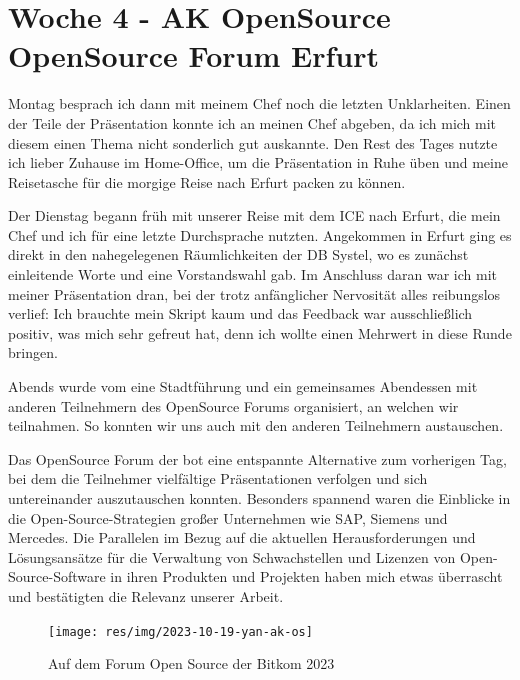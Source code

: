 \section{Woche 4 - AK OpenSource \headerand OpenSource Forum Erfurt} \label{sec:bericht-wo-4}


\lweekdaymarginpar{\weekdayMondayLong}

Montag besprach ich dann mit meinem Chef noch die letzten Unklarheiten.
Einen der Teile der Präsentation konnte ich an meinen Chef abgeben, da ich mich mit diesem einen Thema nicht sonderlich gut auskannte.
Den Rest des Tages nutzte ich lieber Zuhause im Home-Office, um die Präsentation in Ruhe üben und meine Reisetasche für die morgige Reise nach Erfurt packen zu können.

\sweekdaymarginpar{\weekdayTuesdayLong}

Der Dienstag begann früh mit unserer Reise mit dem ICE nach Erfurt, die mein Chef und ich für eine letzte Durchsprache nutzten.
Angekommen in Erfurt ging es direkt in den nahegelegenen Räumlichkeiten der DB Systel, wo es zunächst einleitende Worte und eine Vorstandswahl gab.
Im Anschluss daran war ich mit meiner Präsentation dran, bei der trotz anfänglicher Nervosität alles reibungslos verlief:
Ich brauchte mein Skript kaum und das Feedback war ausschließlich positiv, was mich sehr gefreut hat, denn ich wollte einen Mehrwert in diese Runde bringen.

Abends wurde vom {\bitkom} eine Stadtführung und ein gemeinsames Abendessen mit anderen Teilnehmern des OpenSource Forums organisiert, an welchen wir teilnahmen.
So konnten wir uns auch mit den anderen Teilnehmern austauschen.

\sweekdaymarginpar{\weekdayWednesdayLong}

Das OpenSource Forum der {\bitkom} bot eine entspannte Alternative zum vorherigen Tag, bei dem die Teilnehmer vielfältige Präsentationen verfolgen und sich untereinander auszutauschen konnten.
Besonders spannend waren die Einblicke in die Open-Source-Strategien großer Unternehmen wie SAP, Siemens und Mercedes.
Die Parallelen im Bezug auf die aktuellen Herausforderungen und Lösungsansätze für die Verwaltung von Schwachstellen und Lizenzen von Open-Source-Software in ihren Produkten und Projekten haben mich etwas überrascht und bestätigten die Relevanz unserer Arbeit.

\begin{figure}[htbp] %
    \centering
    \texttt{[image: res/img/2023-10-19-yan-ak-os]}
    \caption{Auf dem Forum Open Source der Bitkom 2023}
    \label{fig:foss23-yan}
\end{figure}

